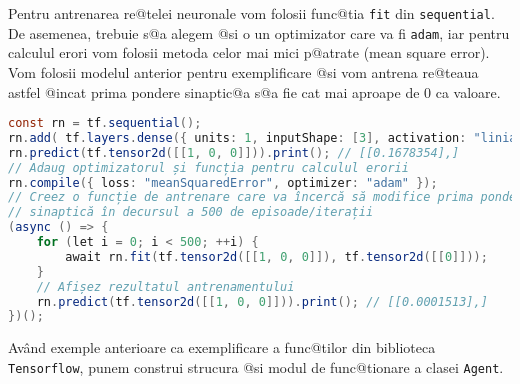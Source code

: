 Pentru antrenarea re@telei neuronale vom folosii func@tia \texttt{fit} din \texttt{sequential}. De asemenea, trebuie s@a alegem @si o un optimizator care va fi \texttt{adam}, iar pentru calculul erori vom folosii metoda celor mai mici p@atrate (mean square error). Vom folosii modelul anterior pentru exemplificare @si vom antrena re@teaua astfel @incat prima pondere sinaptic@a s@a fie cat mai aproape de 0 ca valoare.

\begin{lstlisting}[language=Java, caption={Exemplu de antrenare a unei simple rețele neuronale cu funcție de activare}]
const rn = tf.sequential();
rn.add( tf.layers.dense({ units: 1, inputShape: [3], activation: "liniar", useBias: false }) );
rn.predict(tf.tensor2d([[1, 0, 0]])).print(); // [[0.1678354],] 
// Adaug optimizatorul și funcția pentru calculul erorii
rn.compile({ loss: "meanSquaredError", optimizer: "adam" });
// Creez o funcție de antrenare care va încercă să modifice prima pondere 
// sinaptică în decursul a 500 de episoade/iterații
(async () => {
	for (let i = 0; i < 500; ++i) {
		await rn.fit(tf.tensor2d([[1, 0, 0]]), tf.tensor2d([[0]]));
	}
	// Afișez rezultatul antrenamentului
	rn.predict(tf.tensor2d([[1, 0, 0]])).print(); // [[0.0001513],]
})();
\end{lstlisting}

Av\^ and exemple anterioare ca exemplificare a func@tilor din biblioteca \texttt{Tensorflow}, punem construi strucura @si modul de func@tionare a clasei \texttt{Agent}.

